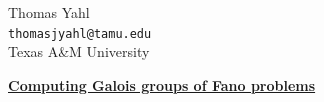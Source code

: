 \documentclass[final]{beamer}
\theoremstyle{thrm}
\begin{document}
\begin{frame}
\Large
\vspace{-2cm}
\begin{minipage}{1\textwidth}

\begin{minipage}[t]{.3\textwidth}
Thomas Yahl\\
\texttt{thomasjyahl@tamu.edu}\\
Texas A\&M University
\vspace{1cm}
\end{minipage}
%
\begin{minipage}{.4\textwidth}
\vspace{2cm}
\begin{center}
{\color{aggiemaroon}\huge\underline{\textbf{Computing Galois groups of Fano problems}}}
\end{center}
\end{minipage}
%
\begin{minipage}{.04\textwidth}
~
\end{minipage}
%
\begin{minipage}{.25\textwidth}
\vspace{2cm}
\begin{center}
\begin{figure}

\end{figure}
\end{center}
\end{minipage}
\end{minipage}
\end{frame}
\end{document}
